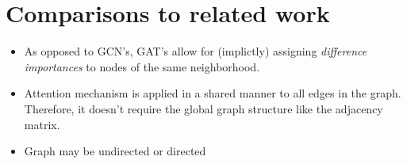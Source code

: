 \documentclass[twocolumn]{article}
\theoremstyle{plain}
\begin{document}
\section{Comparisons to related work}

\begin{itemize}
    \item As opposed to GCN's, GAT's allow for (implictly) assigning \textit{difference importances} to nodes of the same neighborhood.
    \item Attention mechanism is applied in a shared manner to all edges in the graph. Therefore, it doesn't require the global graph structure like the adjacency matrix.
    \item Graph may be undirected or directed
\end{itemize}
\end{document}

